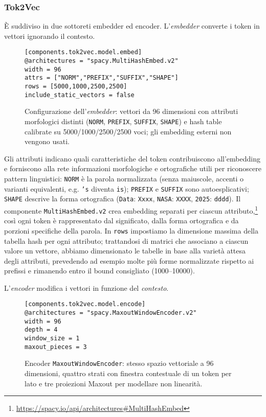 \subsubsection{Tok2Vec}
\noindent È suddiviso in due sottoreti embedder ed encoder. L'\textit{embedder} converte i token in vettori ignorando il contesto.

\begin{figure}[H]
    \centering
    \scriptsize
\begin{lstlisting}[style=cmd]
[components.tok2vec.model.embed]
@architectures = "spacy.MultiHashEmbed.v2"
width = 96
attrs = ["NORM","PREFIX","SUFFIX","SHAPE"]
rows = [5000,1000,2500,2500]
include_static_vectors = false
\end{lstlisting}
    \caption{Configurazione dell'\textit{embedder}: vettori da 96 dimensioni con attributi morfologici distinti (\texttt{NORM}, \texttt{PREFIX}, \texttt{SUFFIX}, \texttt{SHAPE}) e hash table calibrate su 5000/1000/2500/2500 voci; gli embedding esterni non vengono usati.}
    \label{fig:cfg-embed}
\end{figure}

\noindent Gli attributi indicano quali caratteristiche del token contribuiscono all'embedding e forniscono alla rete informazioni morfologiche e ortografiche utili per riconoscere pattern linguistici: \texttt{NORM} è la parola normalizzata (senza maiuscole, accenti o varianti equivalenti, e.g. \texttt{'s} diventa \texttt{is}); \texttt{PREFIX} e \texttt{SUFFIX} sono autoesplicativi; \texttt{SHAPE} descrive la forma ortografica (\texttt{Data}: \texttt{Xxxx}, \texttt{NASA}: \texttt{XXXX}, \texttt{2025}: \texttt{dddd}). Il componente \texttt{MultiHashEmbed.v2} crea embedding separati per ciascun attributo,\footnote{\url{https://spacy.io/api/architectures\#MultiHashEmbed}} così ogni token è rappresentato dal significato, dalla forma ortografica e da porzioni specifiche della parola. In \texttt{rows} impostiamo la dimensione massima della tabella hash per ogni attributo; trattandosi di matrici che associano a ciascun valore un vettore, abbiamo dimensionato le tabelle in base alla varietà attesa degli attributi, prevedendo ad esempio molte più forme normalizzate rispetto ai prefissi e rimanendo entro il bound consigliato (1000--10000).

\noindent L'\textit{encoder} modifica i vettori in funzione del \textit{contesto}.

\begin{figure}[H]
    \centering
    \scriptsize
\begin{lstlisting}[style=cmd]
[components.tok2vec.model.encode]
@architectures = "spacy.MaxoutWindowEncoder.v2"
width = 96
depth = 4
window_size = 1
maxout_pieces = 3
\end{lstlisting}
    \caption{Encoder \texttt{MaxoutWindowEncoder}: stesso spazio vettoriale a 96 dimensioni, quattro strati con finestra contestuale di un token per lato e tre proiezioni Maxout per modellare non linearità.}
    \label{fig:cfg-encode}
\end{figure}

